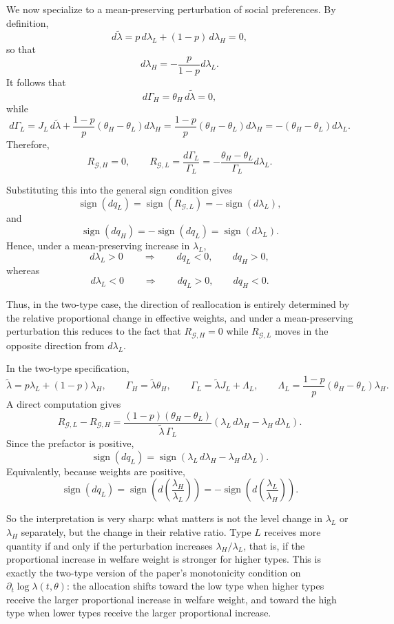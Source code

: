 \documentclass[11pt]{article}
\begin{document}
We now specialize to a mean-preserving perturbation of social preferences. By definition,
\[
d\tilde\lambda
=
p\,d\lambda_L + (1-p)\,d\lambda_H
=
0,
\]
so that
\[
d\lambda_H = -\frac{p}{1-p}d\lambda_L.
\]
It follows that
\[
d\Gamma_H = \theta_H\,d\tilde\lambda = 0,
\]
while
\[
d\Gamma_L
=
J_L\,d\tilde\lambda
+
\frac{1-p}{p}\left(\theta_H-\theta_L\right)d\lambda_H
=
\frac{1-p}{p}\left(\theta_H-\theta_L\right)d\lambda_H
=
-\left(\theta_H-\theta_L\right)d\lambda_L.
\]
Therefore,
\[
R_{\mathcal G,H}=0,
\qquad
R_{\mathcal G,L}
=
\frac{d\Gamma_L}{\Gamma_L}
=
-\frac{\theta_H-\theta_L}{\Gamma_L}d\lambda_L.
\]

Substituting this into the general sign condition gives
\[
\operatorname{sign}(dq_L)
=
\operatorname{sign}(R_{\mathcal G,L})
=
-\operatorname{sign}(d\lambda_L),
\]
and
\[
\operatorname{sign}(dq_H)
=
-\operatorname{sign}(dq_L)
=
\operatorname{sign}(d\lambda_L).
\]
Hence, under a mean-preserving increase in \(\lambda_L\),
\[
d\lambda_L>0
\qquad\Longrightarrow\qquad
dq_L<0,
\qquad
dq_H>0,
\]
whereas
\[
d\lambda_L<0
\qquad\Longrightarrow\qquad
dq_L>0,
\qquad
dq_H<0.
\]

Thus, in the two-type case, the direction of reallocation is entirely determined by the relative proportional change in effective weights, and under a mean-preserving perturbation this reduces to the fact that \(R_{\mathcal G,H}=0\) while \(R_{\mathcal G,L}\) moves in the opposite direction from \(d\lambda_L\).

In the two-type specification,
\[
\tilde\lambda=p\lambda_L+(1-p)\lambda_H,
\qquad
\Gamma_H=\tilde\lambda\theta_H,
\qquad
\Gamma_L=\tilde\lambda J_L+\Lambda_L,
\qquad
\Lambda_L=\frac{1-p}{p}\left(\theta_H-\theta_L\right)\lambda_H.
\]
A direct computation gives
\[
R_{\mathcal G,L}-R_{\mathcal G,H}
=
\frac{(1-p)(\theta_H-\theta_L)}{\tilde\lambda\,\Gamma_L}
\left(\lambda_L\,d\lambda_H-\lambda_H\,d\lambda_L\right).
\]
Since the prefactor is positive,
\[
\operatorname{sign}(dq_L)
=
\operatorname{sign}\left(\lambda_L\,d\lambda_H-\lambda_H\,d\lambda_L\right).
\]
Equivalently, because weights are positive,
\[
\operatorname{sign}(dq_L)
=
\operatorname{sign}\left(d\left(\frac{\lambda_H}{\lambda_L}\right)\right)
=
-\operatorname{sign}\left(d\left(\frac{\lambda_L}{\lambda_H}\right)\right).
\]

So the interpretation is very sharp: what matters is not the level change in \(\lambda_L\) or \(\lambda_H\) separately, but the change in their relative ratio. Type \(L\) receives more quantity if and only if the perturbation increases \(\lambda_H/\lambda_L\), that is, if the proportional increase in welfare weight is stronger for higher types. This is exactly the two-type version of the paper’s monotonicity condition on \(\partial_t\log\lambda(t,\theta)\): the allocation shifts toward the low type when higher types receive the larger proportional increase in welfare weight, and toward the high type when lower types receive the larger proportional increase.
\end{document}
